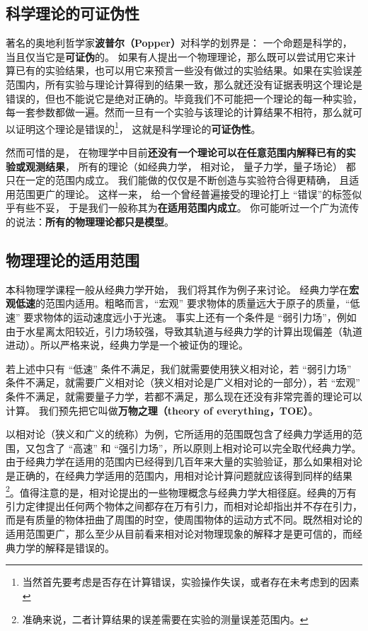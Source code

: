 
\subsection{科学理论的可证伪性}

著名的奥地利哲学家\textbf{波普尔（Popper）}对科学的划界是： 一个命题是科学的， 当且仅当它是\textbf{可证伪}的。 如果有人提出一个物理理论，那么既可以尝试用它来计算已有的实验结果，也可以用它来预言一些没有做过的实验结果。如果在实验误差范围内，所有实验与理论计算得到的结果一致，那么就还没有证据表明这个理论是错误的，但也不能说它是绝对正确的。毕竟我们不可能把一个理论的每一种实验，每一套参数都做一遍。然而一旦有一个实验与该理论的计算结果不相符，那么就可以证明这个理论是错误的\footnote{当然首先要考虑是否存在计算错误，实验操作失误，或者存在未考虑到的因素}， 这就是科学理论的\textbf{可证伪性}。

然而可惜的是， 在物理学中目前\textbf{还没有一个理论可以在任意范围内解释已有的实验或观测结果}， 所有的理论（如经典力学， 相对论， 量子力学，量子场论） 都只在一定的范围内成立。 我们能做的仅仅是不断创造与实验符合得更精确， 且适用范围更广的理论。 这样一来， 给一个曾经普遍接受的理论打上 “错误”的标签似乎有些不妥， 于是我们一般称其为\textbf{在适用范围内成立}。 你可能听过一个广为流传的说法：\textbf{所有的物理理论都只是模型}。

\subsection{物理理论的适用范围}
本科物理学课程一般从经典力学开始， 我们将其作为例子来讨论。 经典力学在\textbf{宏观低速}的范围内适用。粗略而言，“宏观” 要求物体的质量远大于原子的质量，“低速” 要求物体的运动速度远小于光速。 事实上还有一个条件是 “弱引力场”，例如由于水星离太阳较近，引力场较强，导致其轨道与经典力学的计算出现偏差（轨道进动）。所以严格来说，经典力学是一个被证伪的理论。

若上述中只有 “低速” 条件不满足，我们就需要使用狭义相对论，若 “弱引力场” 条件不满足，就需要广义相对论（狭义相对论是广义相对论的一部分），若 “宏观” 条件不满足，就需要量子力学，若都不满足，那么现在还没有非常完善的理论可以计算。 我们预先把它叫做\textbf{万物之理（theory of everything，TOE）}。

以相对论（狭义和广义的统称）为例，它所适用的范围既包含了经典力学适用的范围，又包含了 “高速” 和 “强引力场”，所以原则上相对论可以完全取代经典力学。由于经典力学在适用的范围内已经得到几百年来大量的实验验证，那么如果相对论是正确的，在经典力学适用的范围内，用相对论计算问题就应该得到同样的结果\footnote{准确来说，二者计算结果的误差需要在实验的测量误差范围内。}。值得注意的是，相对论提出的一些物理概念与经典力学大相径庭。经典的万有引力定律提出任何两个物体之间都存在万有引力，而相对论却指出并不存在引力，而是有质量的物体扭曲了周围的时空，使周围物体的运动方式不同。既然相对论的适用范围更广，那么至少从目前看来相对论对物理现象的解释才是更可信的，而经典力学的解释是错误的。 

